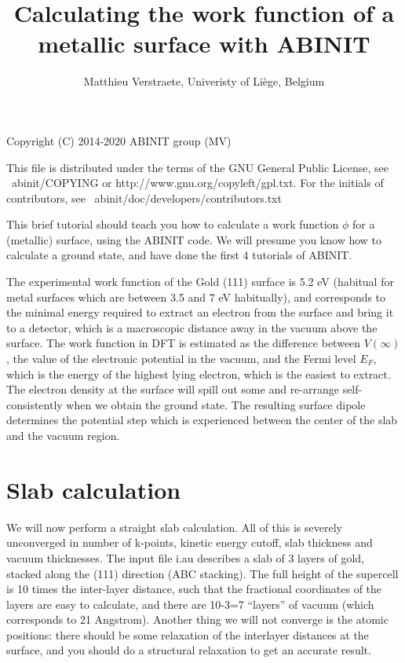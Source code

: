 \documentclass{report}
\begin{document}
\title{Calculating the work function of a metallic surface with ABINIT}

\author{Matthieu Verstraete, Univeristy of Li\`ege, Belgium}

\maketitle
Copyright (C) 2014-2020 ABINIT group (MV)

This file is distributed under the terms of the
GNU General Public License, see ~abinit/COPYING
or http://www.gnu.org/copyleft/gpl.txt.
For the initials of contributors, see ~abinit/doc/developers/contributors.txt

This brief tutorial should teach you how to calculate a work function $\phi$ for a (metallic) surface, using the ABINIT code. We will presume you know how to calculate a ground state, and have done the first 4 tutorials of ABINIT.

The experimental work function of the Gold (111) surface is 5.2 eV (habitual for metal surfaces which are between 3.5 and 7 eV habitually), and corresponds to the minimal energy required to extract an electron from the surface and bring it to a detector, which is a macroscopic distance away in the vacuum above the surface. The work function in DFT is estimated as the difference between $V(\infty)$, the value of the electronic potential in the vacuum, and the Fermi level $E_F$, which is the energy of the highest lying electron, which is the easiest to extract. The electron density at the surface will spill out some and re-arrange self-consistently when we obtain the ground state. The resulting surface dipole determines the potential step which is experienced between the center of the slab and the vacuum region.

\section{Slab calculation}
We will now perform a straight slab calculation. All of this is severely unconverged in number of k-points, kinetic energy cutoff,  slab thickness and vacuum thicknesses. The input file i.au describes a slab of 3 layers of gold, stacked along the (111) direction (ABC stacking). The full height of the supercell is 10 times the inter-layer distance, such that the fractional coordinates of the layers are easy to calculate, and there are 10-3=7 ``layers'' of vacuum (which corresponds to 21 Angstrom). Another thing we will not converge is the atomic positions: there should be some relaxation of the interlayer distances at the surface, and you should do a structural relaxation to get an accurate result.
\end{document}
